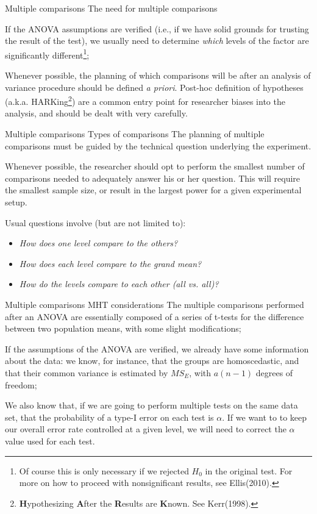 \begin{frame}
{Multiple comparisons}
{The need for multiple comparisons}

If the ANOVA assumptions are verified (i.e., if we have solid grounds for trusting the result of the test), we usually need to determine \textit{which} levels of the factor are significantly different\footnote[1]{\tiny Of course this is only necessary if we rejected $H_0$ in the original test. For more on how to proceed with nonsignificant results, see Ellis(2010).};
\bigskip

Whenever possible, the planning of which comparisons will be after an analysis of variance procedure should be defined \textit{a priori}. Post-hoc definition of hypotheses (a.k.a.  HARKing\footnote[2]{\tiny\textbf{H}ypothesizing \textbf{A}fter the \textbf{R}esults are \textbf{K}nown. See Kerr(1998).}) are a common entry point for researcher biases into the analysis, and should be dealt with very carefully.
\end{frame}
%
%
\begin{frame}
{Multiple comparisons}
{Types of comparisons}
The planning of multiple comparisons must be guided by the technical question underlying the experiment.\bigskip

Whenever possible, the researcher should opt to perform the smallest number of comparisons needed to adequately answer his or her question. This will require the smallest sample size, or result in the largest power for a given experimental setup.\bigskip

Usual questions involve (but are not limited to):

\begin{itemize}
  \item \textit{How does one level compare to the others?}
  \item \textit{How does each level compare to the grand mean?}
  \item \textit{How do the levels compare to each other (all vs. all)?}
\end{itemize}
\end{frame}
%
%
\begin{frame}
{Multiple comparisons}
{MHT considerations}
The multiple comparisons performed after an ANOVA are essentially composed of a series of t-tests for the difference between two population means, with some slight modifications;
\bigskip

If the assumptions of the ANOVA are verified, we already have some information about the data: we know, for instance, that the groups are homoscedastic, and that their common variance is estimated by $MS_E$, with $a(n-1)$ degrees of freedom;
\bigskip

We also know that, if we are going to perform multiple tests on the same data set, that the probability of a type-I error on each test is $\alpha$. If we want to to keep our overall error rate controlled at a given level, we will need to correct the $\alpha$ value used for each test.%
\end{frame}

